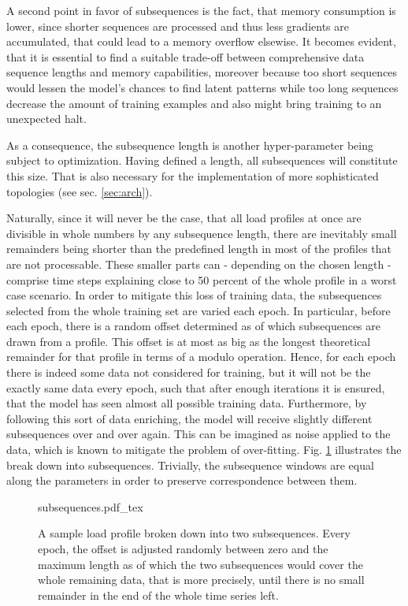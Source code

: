 A second point in favor of subsequences is the fact, that memory consumption is lower, since shorter sequences are processed and thus less gradients are accumulated, that could lead to a memory overflow elsewise.
It becomes evident, that it is essential to find a suitable trade-off between comprehensive data sequence lengths and memory capabilities, moreover because too short sequences would lessen the model's chances to find latent patterns while too long sequences decrease the amount of training examples and also might bring training to an unexpected halt.    

As a consequence, the subsequence length is another hyper-parameter being subject to optimization.
Having defined a length, all subsequences will constitute this size.
That is also necessary for the implementation of more sophisticated topologies (see sec. \ref{sec:arch}).

Naturally, since it will never be the case, that all load profiles at once are divisible in whole numbers by any subsequence length, there are inevitably small remainders being shorter than the predefined length in most of the profiles that are not processable.
These smaller parts can - depending on the chosen length - comprise time steps explaining close to 50 percent of the whole profile in a worst case scenario.  
In order to mitigate this loss of training data, the subsequences selected from the whole training set are varied each epoch.
In particular, before each epoch, there is a random offset determined as of which subsequences are drawn from a profile.
This offset is at most as big as the longest theoretical remainder for that profile in terms of a modulo operation.
Hence, for each epoch there is indeed some data not considered for training, but it will not be the exactly same data every epoch, such that after enough iterations it is ensured, that the model has seen almost all possible training data.
Furthermore, by following this sort of data enriching, the model will receive slightly different subsequences over and over again.
This can be imagined as noise applied to the data, which is known to mitigate the problem of over-fitting. 
Fig. \ref{fig:subsequences} illustrates the break down into subsequences.
Trivially, the subsequence windows are equal along the parameters in order to preserve correspondence between them.
\begin{figure}
	\centering
	\def\svgwidth{0.8\columnwidth}
         {subsequences.pdf_tex}
         \caption{A sample load profile broken down into two subsequences. Every epoch, the offset is adjusted randomly between zero and the maximum length as of which the two subsequences would cover the whole remaining data, that is more precisely, until there is no small remainder in the end of the whole time series left. }
	\label{fig:subsequences}
\end{figure}

